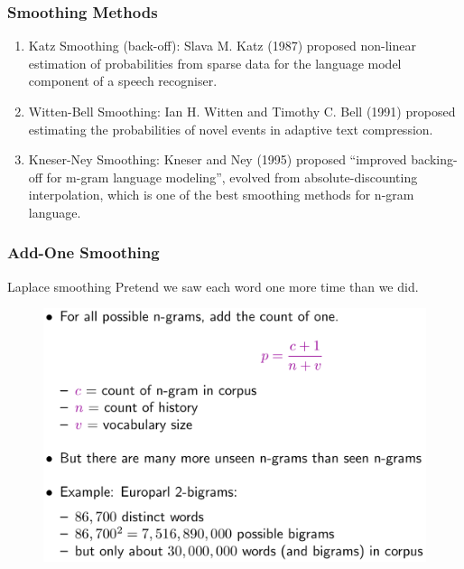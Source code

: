 \documentclass{beamer}
\begin{document}
\begin{frame}\frametitle{Smoothing Methods}

\begin{enumerate}
\item Katz Smoothing (back-off):  Slava M. Katz (1987) proposed
  non-linear estimation of probabilities from sparse data for the
  language model component of a speech recogniser.  
\item Witten-Bell Smoothing: Ian H. Witten and Timothy C. Bell (1991)
  proposed estimating the probabilities of novel events in adaptive
  text compression.  
\item Kneser-Ney Smoothing:
   Kneser and Ney (1995) proposed ``improved backing-off for m-gram language
   modeling'',  evolved from absolute-discounting interpolation, which
   is one of the best smoothing methods for n-gram language.  

\end{enumerate}

\end{frame}

\begin{frame}\frametitle{Add-One Smoothing}

\begin{block}{Laplace smoothing}
Pretend we saw each word one more time than we did.

\begin{figure}
\includegraphics[width=0.6\linewidth]{figure/laplace_smoothing.pdf}
\label{fig:laplace_smoothing}
\end{figure}

\end{block}
\end{frame}
\end{document}
